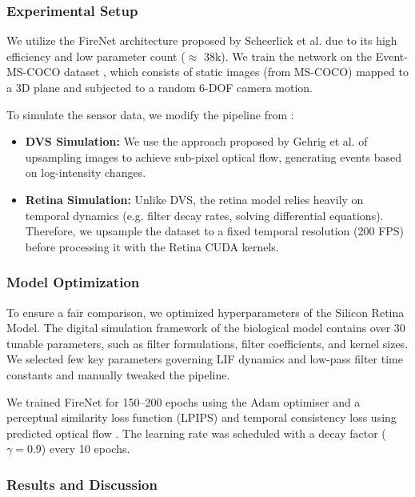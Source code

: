 \documentclass{article}
\begin{document}
\subsubsection{Experimental Setup}
We utilize the FireNet architecture proposed by Scheerlick et al. \cite{scheerlinck_fast_2020} due to its high efficiency and low parameter count ($\approx$ 38k). We train the network on the Event-MS-COCO dataset \cite{scheerlinck_fast_2020}, which consists of static images (from MS-COCO) mapped to a 3D plane and subjected to a random 6-DOF camera motion.

To simulate the sensor data, we modify the pipeline from \cite{gehrig_video_2020}: 
\begin{itemize}
    \item \textbf{DVS Simulation:} We use the approach proposed by Gehrig et al. \cite{gehrig_video_2020} of upsampling images to achieve sub-pixel optical flow, generating events based on log-intensity changes.
    \item \textbf{Retina Simulation:} Unlike DVS, the retina model relies heavily on temporal dynamics (e.g. filter decay rates, solving differential equations). Therefore, we upsample the dataset to a fixed temporal resolution (200 FPS) before processing it with the Retina CUDA kernels.
\end{itemize}

\subsubsection{Model Optimization}
To ensure a fair comparison, we optimized hyperparameters of the Silicon Retina Model. The digital simulation framework of the biological model contains over 30 tunable parameters, such as filter formulations, filter coefficients, and kernel sizes. We selected few key parameters governing LIF dynamics and low-pass filter time constants and manually tweaked the pipeline. 

We trained FireNet for 150--200 epochs using the Adam optimiser and a perceptual similarity loss function (LPIPS) \cite{zhang_unreasonable_2018} and temporal consistency loss using predicted optical flow \cite{gehrig_video_2020}. The learning rate was scheduled with a decay factor ($\gamma=0.9$) every 10 epochs.

\subsubsection{Results and Discussion}
\end{document}
